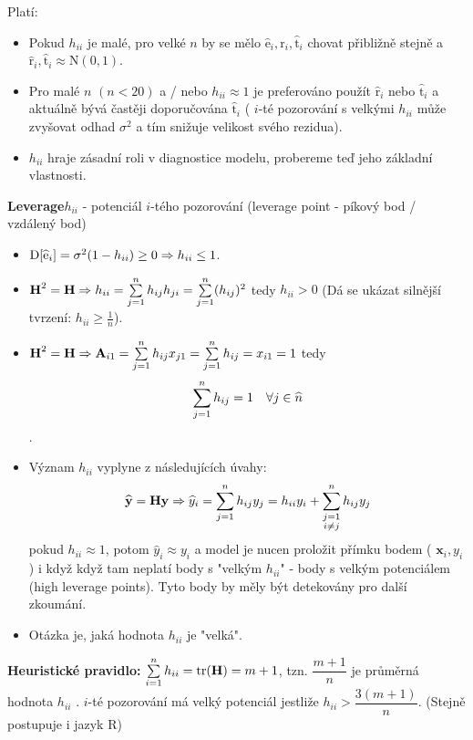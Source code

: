 \begin{remark}
Platí:
\begin{itemize}
\item Pokud $ h_{ii} $ je malé, pro velké $ n $ by se mělo $ \widehat{\text{e}}_i, \widehat{\text{r}}_i, \widehat{\text{t}}_i $ chovat přibližně stejně a $  \widehat{\text{r}}_i ,\widehat{\text{t}}_i \approx \text{N} ( 0 , 1 ) $. 
\item Pro malé $ n $ $ ( n < 20 ) $ a / nebo  $ h_{ii} \approx 1 $ je preferováno použít $\widehat{\text{r}}_i$ nebo $\widehat{\text{t}}_i $ a aktuálně bývá častěji doporučována $\widehat{\text{t}}_i $ ( $ i $-té pozorování s velkými $ h_{ii} $ může zvyšovat odhad $ \sigma^2 $ a tím snižuje velikost svého rezidua).
\item $ h_{ii} $ hraje zásadní roli v diagnostice modelu, probereme teď jeho základní vlastnosti.
\end{itemize}
\end{remark}

\textbf{Leverage}$ h_{ii} $ - potenciál $ i $-tého pozorování (leverage point - píkový bod / vzdálený bod)

\begin{itemize}
\item $ \mathrm{D} [ \widehat{\text{e}}_i ] = \sigma^2 ( 1 - h_{ii} ) \geq 0 \Rightarrow h_{ii} \leq 1 $.
\item $ \textbf{H}^2 = \textbf{H} \Rightarrow h_{ii} = \sum\limits_{j=1}^{n} h_{ij} h_{ji} = \sum\limits_{j=1}^{n} (h_{ij})^2 $ tedy $ h_{ii} > 0 $ (Dá se ukázat silnější tvrzení: $ h_{ii} \geq \frac{1}{n} $).
\item $ \textbf{H}^2 = \textbf{H} \Rightarrow \textbf{A}_{i1} = \sum\limits_{j=1}^{n} h_{ij} x_{j1} = \sum\limits_{j=1}^{n} h_{ij} = x_{i1} = 1  $ tedy
$$ \sum\limits_{j=1}^{n} h_{ij} = 1 \quad \forall j \in \widehat{n} $$.
\item Význam $ h_{ii} $ vyplyne z následujících úvahy:
$$ 
 \widehat{\textbf{y}} = \textbf{Hy} \Rightarrow \widehat{y}_i = \sum\limits_{j=1}^{n} h_{ij}y_j = h_{ii} y_i + \sum\limits_{\substack{j=1 \\ i\neq j}}^n h_{ij} y_j
 $$
 pokud $ h_{ii} \approx 1 $, potom   $ \widehat{y}_i \approx y_i $ a model je nucen proložit přímku bodem ( $ \textbf{x}_i , y_i $) i když když tam neplatí body s "velkým $ h_{ii} $" - body s velkým potenciálem (high leverage points). Tyto body by měly být detekovány pro další zkoumání.
 \item Otázka je, jaká hodnota $ h_{ii} $ je "velká".
\end{itemize}
\textbf{Heuristické pravidlo:}
$ \sum\limits_{i=1}^{n} h_{ii} = \text{tr}(\textbf{H}) = m + 1 $, tzn. $ \dfrac{m+1}{n} $ je průměrná hodnota $ h_{ii}$ . $ i $-té pozorování má velký potenciál jestliže $ h_{ii} > \dfrac{3(m+1)}{n} $. (Stejně postupuje i jazyk R)

